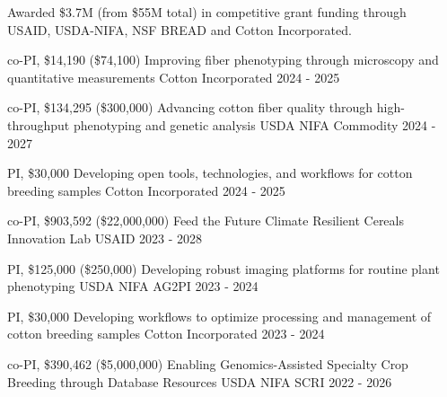 
\begin{cvgrants}

  \cvsummarytext
    {}
    {Awarded \$3.7M (from \$55M total) in competitive grant funding through \\USAID, USDA-NIFA, NSF BREAD and Cotton Incorporated.}
    
  \leavevmode\newline
  \cvgrant
    {co-PI, \$14,190 (\$74,100)}
    {Improving fiber phenotyping through microscopy and quantitative measurements}
    {Cotton Incorporated} %
    {2024 - 2025}
    {
    }
  
  \cvgrant
    {co-PI, \$134,295 (\$300,000)}
    {Advancing cotton fiber quality through high-throughput phenotyping and genetic analysis}
    {USDA NIFA Commodity} %
    {2024 - 2027}
    {
    }

  \cvgrant
    {PI, \$30,000}
    {Developing open tools, technologies, and workflows for cotton breeding samples}
    {Cotton Incorporated} %
    {2024 - 2025}
    {
    }

  \cvgrant
    {co-PI, \$903,592 (\$22,000,000)}
    {Feed the Future Climate Resilient Cereals Innovation Lab}
    {USAID} %
    {2023 - 2028}
    {
    }

  \cvgrant
    {PI, \$125,000 (\$250,000)}
    {Developing robust imaging platforms for routine plant phenotyping}
    {USDA NIFA AG2PI} %
    {2023 - 2024}
    {
    }

  \cvgrant
    {PI, \$30,000}
    {Developing workflows to optimize processing and management of cotton breeding samples}
    {Cotton Incorporated} %
    {2023 - 2024}
    {
    }

  \cvgrant
    {co-PI, \$390,462 (\$5,000,000)}
    {Enabling Genomics-Assisted Specialty Crop Breeding through Database Resources}
    {USDA NIFA SCRI} %
    {2022 - 2026}
    {
    }


\end{cvgrants}
